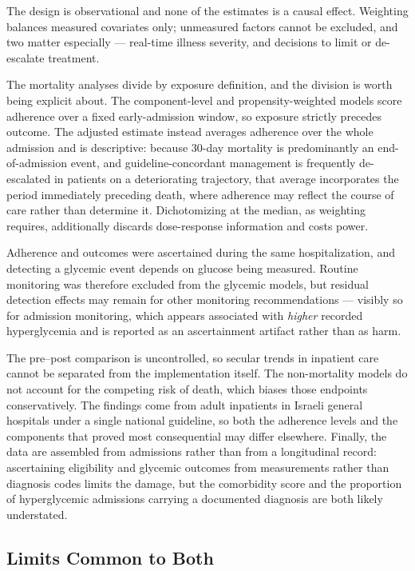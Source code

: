 The design is observational and none of the estimates is a causal effect. Weighting balances measured covariates only; unmeasured factors cannot be excluded, and two matter especially --- real-time illness severity, and decisions to limit or de-escalate treatment.

The mortality analyses divide by exposure definition, and the division is worth being explicit about. The component-level and propensity-weighted models score adherence over a fixed early-admission window, so exposure strictly precedes outcome. The adjusted estimate instead averages adherence over the whole admission and is descriptive: because $30$-day mortality is predominantly an end-of-admission event, and guideline-concordant management is frequently de-escalated in patients on a deteriorating trajectory, that average incorporates the period immediately preceding death, where adherence may reflect the course of care rather than determine it. Dichotomizing at the median, as weighting requires, additionally discards dose-response information and costs power.

Adherence and outcomes were ascertained during the same hospitalization, and detecting a glycemic event depends on glucose being measured. Routine monitoring was therefore excluded from the glycemic models, but residual detection effects may remain for other monitoring recommendations --- visibly so for admission monitoring, which appears associated with \emph{higher} recorded hyperglycemia and is reported as an ascertainment artifact rather than as harm.

The pre--post comparison is uncontrolled, so secular trends in inpatient care cannot be separated from the implementation itself. The non-mortality models do not account for the competing risk of death, which biases those endpoints conservatively. The findings come from adult inpatients in Israeli general hospitals under a single national guideline, so both the adherence levels and the components that proved most consequential may differ elsewhere. Finally, the data are assembled from admissions rather than from a longitudinal record: ascertaining eligibility and glycemic outcomes from measurements rather than diagnosis codes limits the damage, but the comorbidity score and the proportion of hyperglycemic admissions carrying a documented diagnosis are both likely understated.

\subsection{Limits Common to Both}

